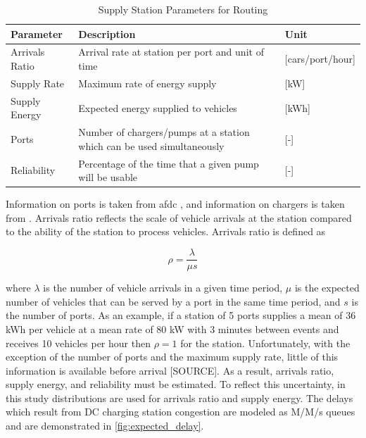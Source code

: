 \documentclass[11pt]{article}
\begin{document}
\begin{multicols}{2}
\begin{table}[H]
	\centering
	\caption{Supply Station Parameters for Routing}
	\label{tab:param_supply}
	\begin{tabular}{|C{/8}|C{/8}|C{/8}|}
		\hline Parameter & Description & Unit \\
		\hline Arrivals Ratio & Arrival rate at station per port and unit of time & [cars/port/hour] \\
		\hline Supply Rate & Maximum rate of energy supply & [kW] \\
		\hline Supply Energy & Expected energy supplied to vehicles & [kWh] \\
		\hline Ports & Number of chargers/pumps at a station which can be used simultaneously & [-] \\
		\hline Reliability & Percentage of the time that a given pump will be usable & [-] \\ 
		\hline
	\end{tabular}
\end{table}

Information on ports is taken from \gls{afdc} \cite{afdc_2023}, and information on chargers is taken from \cite{Rempel_2023}. Arrivals ratio reflects the scale of vehicle arrivals at the station compared to the ability of the station to process vehicles. Arrivals ratio is defined as

\begin{equation}
	\rho = \frac{\lambda}{\mu s}\label{eq:rho}
\end{equation}

where $\lambda$ is the number of vehicle arrivals in a given time period, $\mu$ is the expected number of vehicles that can be served by a port in the same time period, and $s$ is the number of ports. As an example, if a station of 5 ports supplies a mean of 36 kWh per vehicle at a mean rate of 80 kW with 3 minutes between events and receives 10 vehicles per hour then $\rho = 1$ for the station. Unfortunately, with the exception of the number of ports and the maximum supply rate, little of this information is available before arrival [SOURCE]. As a result, arrivals ratio, supply energy, and reliability must be estimated. To reflect this uncertainty, in this study distributions are used for arrivals ratio and supply energy. The delays which result from DC charging station congestion are modeled as M/M/s queues and are demonstrated in \ref{fig:expected_delay}.

\end{multicols}
\end{document}
